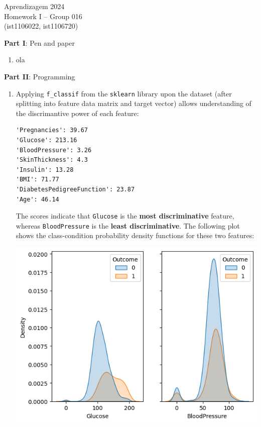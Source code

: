 \documentclass[12pt]{article}
\begin{document}
\center
Aprendizagem 2024\\
Homework I -- Group 016\\
(ist1106022, ist1106720)\vskip 1cm

\large{\textbf{Part I}: Pen and paper}\normalsize

\begin{enumerate}[leftmargin=\labelsep, label=\textbf{\arabic*.)}]
    \item ola
\end{enumerate}

\large{\textbf{Part II}: Programming}\normalsize

\begin{enumerate}[leftmargin=\labelsep, label=\textbf{\arabic*.)}]
    \item Applying \texttt{f\_classif} from the \texttt{sklearn} library upon the dataset (after splitting into feature data matrix and target vector) allows understanding of the discrimantive power of each feature: \vskip 0.25cm
          \begin{lstlisting}[basicstyle=\ttfamily\centering]
'Pregnancies': 39.67
'Glucose': 213.16
'BloodPressure': 3.26
'SkinThickness': 4.3
'Insulin': 13.28
'BMI': 71.77
'DiabetesPedigreeFunction': 23.87
'Age': 46.14
        \end{lstlisting}
          The scores indicate that \texttt{Glucose} is the \textbf{most discriminative} feature, whereas \texttt{BloodPressure} is the \textbf{least discriminative}.
          The following plot shows the class-condition probability density functions for these two features:\vskip 0.25cm
          \begin{center}
              \includegraphics{discrimantive_features_dense_probability.png}

\end{center}
\end{enumerate}
\end{document}
